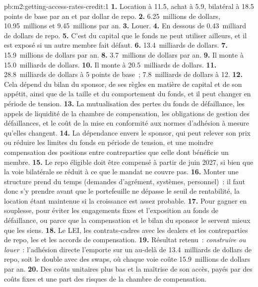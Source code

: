 \begin{solution}{pb:m2:getting-access-rates-credit:1}
\textbf{1.} Location à 11.5, achat à 5.9, bilatéral à 18.5 points de base par an et par dollar de repo.
\textbf{2.} 6.25~millions de dollars, 10.95~millions et 9.45~millions par an.
\textbf{3.} Louer.
\textbf{4.} En dessous de 0.43~milliard de dollars de repo.
\textbf{5.} C'est du capital que le fonds ne peut utiliser ailleurs, et il est exposé si un autre
membre fait défaut.
\textbf{6.} 13.4~milliards de dollars.
\textbf{7.} 15.9~millions de dollars par an.
\textbf{8.} 3.7~millions de dollars par an.
\textbf{9.} Il monte à 15.0~milliards de dollars.
\textbf{10.} Il monte à 20.5~milliards de dollars.
\textbf{11.} 28.8~milliards de dollars à 5 points de base~; 7.8~milliards de dollars à 12.
\textbf{12.} Cela dépend du bilan du sponsor, de ses règles en matière de capital et de son appétit,
ainsi que de la taille et du comportement du fonds, et il peut changer en période de tension.
\textbf{13.} La mutualisation des pertes du fonds de défaillance, les appels de liquidité de la chambre de
compensation, les obligations de gestion des défaillances, et le coût de la mise en conformité aux normes d'adhésion à mesure qu'elles changent.
\textbf{14.} La dépendance envers le sponsor, qui peut relever son prix ou réduire les
limites du fonds en période de tension, et une moindre compensation des positions entre contreparties que celle dont bénéficie un membre.
\textbf{15.} Le repo éligible doit être compensé à partir de juin 2027, si bien que la voie bilatérale
se réduit à ce que le mandat ne couvre pas.
\textbf{16.} Monter une structure prend du temps (demandes d'agrément, systèmes, personnel)~: il faut donc s'y prendre
avant que le portefeuille ne dépasse le seuil de rentabilité, la location étant maintenue si la croissance est
assez probable.
\textbf{17.} Pour gagner en souplesse, pour éviter les engagements fixes et l'exposition au fonds de défaillance, ou
parce que la compensation et le bilan du sponsor le servent mieux que les siens.
\textbf{18.} Le LEI, les contrats-cadres avec les dealers et les contreparties de repo, les  et les accords de compensation.
\textbf{19.} Résultat retenu~: \emph{construire ou louer}~: l'adhésion directe l'emporte sur un 
au-delà de 13.4~milliards de dollars de repo, soit le double avec des swaps, où chaque voie coûte
15.9~millions de dollars par an.
\textbf{20.} Des coûts unitaires plus bas et la maîtrise de son accès, payés par des coûts fixes
et une part des risques de la chambre de compensation.
\end{solution}


